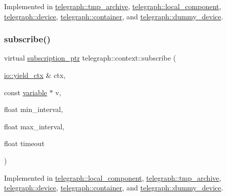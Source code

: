 Implemented in \hyperlink{classtelegraph_1_1tmp__archive_a9cf4be673f860b875b085c1ecac913ff}{telegraph\+::tmp\+\_\+archive}, \hyperlink{classtelegraph_1_1local__component_a53aa0199bd938578a6400cfd3a19c86f}{telegraph\+::local\+\_\+component}, \hyperlink{classtelegraph_1_1device_aedf52d2dbb133e2b71958c116671b9df}{telegraph\+::device}, \hyperlink{classtelegraph_1_1container_ae1ae26a08bf3d367bbc13020623780b2}{telegraph\+::container}, and \hyperlink{classtelegraph_1_1dummy__device_a8996ac06dfc98de11c3d156b4a0a2caf}{telegraph\+::dummy\+\_\+device}.

\mbox{\label{classtelegraph_1_1context_aec3b3b0d7210a86f2ea2f5067ef8e922}} 
\subsubsection{\texorpdfstring{subscribe()}{subscribe()}\hspace{0.1cm}{\footnotesize\ttfamily [2/2]}}
{\footnotesize\ttfamily virtual \hyperlink{namespacetelegraph_a58641aa5b1a2cbdb0431916a87069f64}{subscription\+\_\+ptr} telegraph\+::context\+::subscribe (\begin{DoxyParamCaption}\item[{\hyperlink{structboost_1_1asio_1_1yield__ctx}{io\+::yield\+\_\+ctx} \&}]{ctx,  }\item[{const \hyperlink{classtelegraph_1_1variable}{variable} $\ast$}]{v,  }\item[{float}]{min\+\_\+interval,  }\item[{float}]{max\+\_\+interval,  }\item[{float}]{timeout }\end{DoxyParamCaption})\hspace{0.3cm}{\ttfamily [pure virtual]}}



Implemented in \hyperlink{classtelegraph_1_1local__component_a5a2282f1cf80dce32ed26e37c956d5c4}{telegraph\+::local\+\_\+component}, \hyperlink{classtelegraph_1_1tmp__archive_a10adc383103f4183e0a37485a5406cf1}{telegraph\+::tmp\+\_\+archive}, \hyperlink{classtelegraph_1_1device_ab0117f6015f904afae72d6ab90c8ad95}{telegraph\+::device}, \hyperlink{classtelegraph_1_1container_aa11f4e622d784b566a032c05f2019264}{telegraph\+::container}, and \hyperlink{classtelegraph_1_1dummy__device_a06470ed069c481e8199dce9387448c8b}{telegraph\+::dummy\+\_\+device}.

